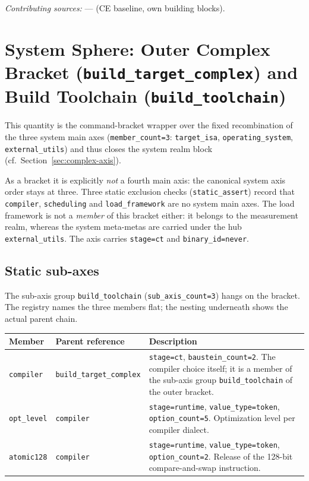 \emph{Contributing sources:} --- (CE baseline, own building blocks).

\section[head={System Sphere: Complex Bracket and Build Toolchain}]{System Sphere: Outer Complex Bracket (\texttt{build\_target\_complex}) and Build Toolchain (\texttt{build\_toolchain})}

This quantity is the command-bracket wrapper over the fixed recombination of the three system main axes (\texttt{member\_\allowbreak{}count=3}: \texttt{target\_\allowbreak{}isa}, \texttt{operating\_\allowbreak{}system}, \texttt{external\_\allowbreak{}utils}) and thus closes the system realm block (cf.\ Section~\ref{sec:complex-axis}).

As a bracket it is explicitly \emph{not} a fourth main axis: the canonical system axis order stays at three. Three static exclusion checks (\texttt{static\_\allowbreak{}assert}) record that \texttt{compiler}, \texttt{scheduling} and \texttt{load\_\allowbreak{}framework} are no system main axes. The load framework is not a \emph{member} of this bracket either: it belongs to the measurement realm, whereas the system meta-metas are carried under the hub \texttt{external\_\allowbreak{}utils}. The axis carries \texttt{stage=ct} and \texttt{binary\_\allowbreak{}id=never}.

\subsection*{Static sub-axes}

The sub-axis group \texttt{build\_\allowbreak{}toolchain} (\texttt{sub\_\allowbreak{}axis\_\allowbreak{}count=3}) hangs on the bracket. The registry names the three members flat; the nesting underneath shows the actual parent chain.

\begin{scriptsize}
\begin{longtable}{@{}>{\raggedright\arraybackslash}p{2.2cm} >{\raggedright\arraybackslash}p{3.4cm} >{\raggedright\arraybackslash}p{7.9cm}@{}}
\toprule
Member & Parent reference & Description \\
\midrule
\endhead%
\texttt{compiler} & \texttt{build\_\allowbreak{}target\_\allowbreak{}complex} & \texttt{stage=ct}, \texttt{baustein\_\allowbreak{}count=2}. The compiler choice itself; it is a member of the sub-axis group \texttt{build\_\allowbreak{}toolchain} of the outer bracket. \\
\texttt{opt\_\allowbreak{}level} & \texttt{compiler} & \texttt{stage=runtime}, \texttt{value\_\allowbreak{}type=token}, \texttt{option\_\allowbreak{}count=5}. Optimization level per compiler dialect. \\
\texttt{atomic128} & \texttt{compiler} & \texttt{stage=runtime}, \texttt{value\_\allowbreak{}type=token}, \texttt{option\_\allowbreak{}count=2}. Release of the 128-bit compare-and-swap instruction. \\
\bottomrule
\end{longtable}
\end{scriptsize}

